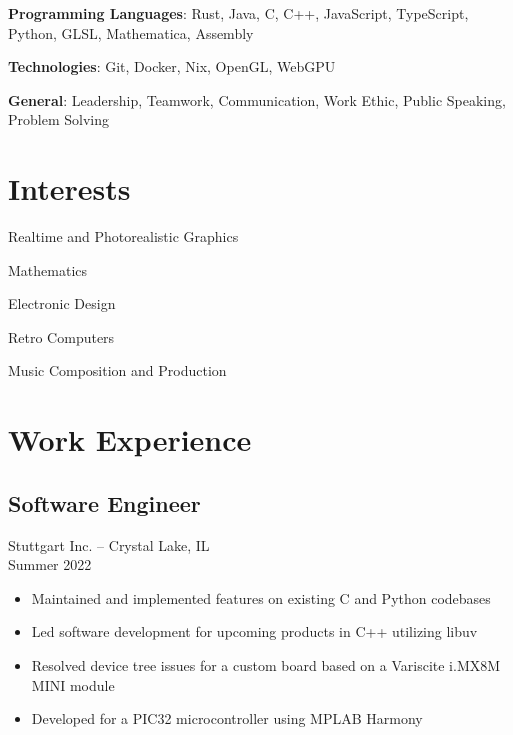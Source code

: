 \documentclass[letterpaper,10pt]{article}
\begin{document}
\begin{paracol}{2}
    \textbf{Programming Languages}: Rust, Java, C, C++, JavaScript, TypeScript, Python, GLSL, Mathematica, Assembly

    \medskip

    \textbf{Technologies}: Git, Docker, Nix, OpenGL, WebGPU

    \medskip

    \textbf{General}: Leadership, Teamwork, Communication, Work Ethic, Public Speaking, Problem Solving

    \section*{Interests}

    Realtime and Photorealistic Graphics

    \medskip

    Mathematics

    \medskip

    Electronic Design

    \medskip

    Retro Computers

    \medskip

    Music Composition and Production

    \switchcolumn

    \section*{Work Experience}

    \subsection*{Software Engineer}
    Stuttgart Inc. -- Crystal Lake, IL \\
    Summer 2022

    \begin{itemize}[topsep=0.5em, partopsep=0em, itemsep=0.125em]
        \item Maintained and implemented features on existing C and Python codebases
        \item Led software development for upcoming products in C++ utilizing libuv
        \item Resolved device tree issues for a custom board based on a Variscite i.MX8M MINI module
        \item Developed for a PIC32 microcontroller using MPLAB Harmony
    \end{itemize}


\end{paracol}
\end{document}
